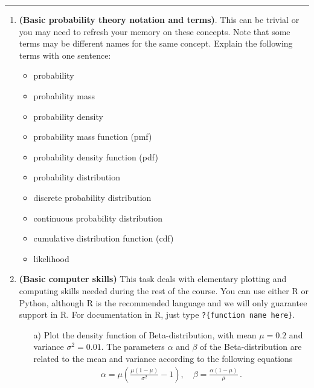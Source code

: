 \documentclass[11pt,a4paper,english]{article}
\newcommand{\HRule}{\rule{\linewidth}{0.5mm}}
\begin{document}
\HRule

\newpage

\begin{enumerate}

\item {\bf (Basic probability theory notation and terms)}. This can be trivial or you may need to refresh your memory on these concepts. Note that some terms may be different names for the same concept. Explain the following terms with one sentence:
  \begin{itemize}
    \item probability
    \item probability mass
    \item probability density
    \item probability mass function (pmf)
    \item probability density function (pdf)
    \item probability distribution
    \item discrete probability distribution
    \item continuous probability distribution
    \item cumulative distribution function (cdf)
    \item likelihood
  \end{itemize}

\item {\bf (Basic computer skills)} This task deals with elementary plotting and computing skills needed during the rest of the course. You can use either R or Python, although R is the recommended language and we will only guarantee support in R. For documentation in R, just type \texttt{?\{function name here\}}.
\begin{itemize}
    \item[a)] Plot the density function of Beta-distribution, with mean $\mu = 0.2$ and variance $\sigma^2=0.01$. The parameters $\alpha$ and $\beta$ of the Beta-distribution are related to the mean and variance according to the following equations
    \begin{align*}
    \alpha = \mu \left( \frac{\mu(1-\mu)}{\sigma^2} - 1 \right), \quad
    \beta = \frac{\alpha (1-\mu) }{\mu} \,.
\end{align*}


\end{itemize}
\end{enumerate}
\end{document}
